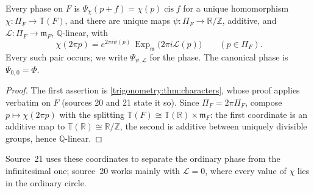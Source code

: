 \documentclass[11pt,letterpaper]{article}
\numberwithin{equation}{section}
\theoremstyle{definition}
\theoremstyle{remark}
\newcommand{\R}{\mathbb R}
\newcommand{\Q}{\mathbb Q}
\newcommand{\Z}{\mathbb Z}
\newcommand{\mm}{\mathfrak m}
\newcommand{\TT}{\mathbb T}
\newcommand{\cis}{\operatorname{cis}}
\newcommand{\Ex}{\operatorname{Exp}_{\mm}}
\newcommand{\cL}{\mathcal L}
\begin{document}
\begin{proposition}
\label{trigonometry:per:prop:coordinates}
Every phase on $F$ is $\Psi_\chi(p+f)=\chi(p)\cis f$ for a unique homomorphism
$\chi:\Pi_F\to\TT(F)$, and there are unique maps $\psi:\Pi_F\to\R/\Z$, additive, and
$\cL:\Pi_F\to\mm_F$, $\Q$-linear, with
\begin{equation}\label{trigonometry:per:eq:coordinates}
 \chi(2\pi p)=e^{2\pi i\psi(p)}\,\Ex\bigl(2\pi i\cL(p)\bigr)\qquad(p\in\Pi_F).
\end{equation}
Every such pair occurs; we write $\Psi_{\psi,\cL}$ for the phase. The canonical phase is
$\Psi_{0,0}=\Phi$.
\end{proposition}
\begin{proof}
The first assertion is \cref{trigonometry:thm:characters}, whose proof applies verbatim on $F$
(sources 20 and 21 state it so). Since $\Pi_F=2\pi\Pi_F$, compose $p\mapsto\chi(2\pi p)$ with the
splitting $\TT(F)\cong\TT(\R)\times\mm_F$: the first coordinate is an additive map to
$\TT(\R)\cong\R/\Z$, the second is additive between uniquely divisible groups, hence $\Q$-linear.
\end{proof}
Source~21 uses these coordinates to separate the ordinary phase from the infinitesimal one; source~20
works mainly with $\cL=0$, where every value of $\chi$ lies in the ordinary circle.
\end{document}
